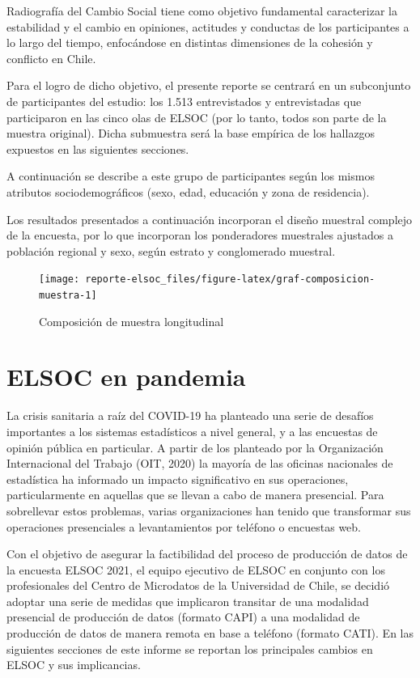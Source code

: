 \documentclass[
  12pt,
]{book}
\begin{document}
Radiografía del Cambio Social tiene como objetivo fundamental caracterizar la estabilidad y el cambio en opiniones, actitudes y conductas de los participantes a lo largo del tiempo, enfocándose en distintas dimensiones de la cohesión y conflicto en Chile.

Para el logro de dicho objetivo, el presente reporte se centrará en un subconjunto de participantes del estudio: los 1.513 entrevistados y entrevistadas que participaron en las cinco olas de ELSOC (por lo tanto, todos son parte de la muestra original). Dicha submuestra será la base empírica de los hallazgos expuestos en las siguientes secciones.

A continuación se describe a este grupo de participantes según los mismos atributos sociodemográficos (sexo, edad, educación y zona de residencia).

Los resultados presentados a continuación incorporan el diseño muestral complejo de la encuesta, por lo que incorporan los ponderadores muestrales ajustados a población regional y sexo, según estrato y conglomerado muestral.

\begin{figure}

{\centering \texttt{[image: reporte-elsoc\_files/figure-latex/graf-composicion-muestra-1]} 

}

\caption{Composición de muestra longitudinal}\label{fig:graf-composicion-muestra}
\end{figure}

\hypertarget{elsoc-en-pandemia}{%
\section{ELSOC en pandemia}\label{elsoc-en-pandemia}}

La crisis sanitaria a raíz del COVID-19 ha planteado una serie de desafíos importantes a los sistemas estadísticos a nivel general, y a las encuestas de opinión pública en particular. A partir de los planteado por la Organización Internacional del Trabajo (OIT, 2020) la mayoría de las oficinas nacionales de estadística ha informado un impacto significativo en sus operaciones, particularmente en aquellas que se llevan a cabo de manera presencial. Para sobrellevar estos problemas, varias organizaciones han tenido que transformar sus operaciones presenciales a levantamientos por teléfono o encuestas web.

Con el objetivo de asegurar la factibilidad del proceso de producción de datos de la encuesta ELSOC 2021, el equipo ejecutivo de ELSOC en conjunto con los profesionales del Centro de Microdatos de la Universidad de Chile, se decidió adoptar una serie de medidas que implicaron transitar de una modalidad presencial de producción de datos (formato CAPI) a una modalidad de producción de datos de manera remota en base a teléfono (formato CATI). En las siguientes secciones de este informe se reportan los principales cambios en ELSOC y sus implicancias.
\end{document}
